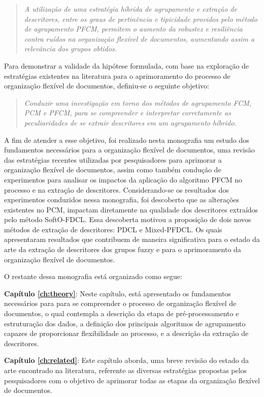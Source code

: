 \begin{quote}
\textit{A utilização de uma estratégia híbrida de agrupamento e extração de descritores, entre os 
  graus de pertinência e tipicidade providos pelo método de agrupamento PFCM, permitem o aumento da
    robustez e resiliência contra ruídos na organização flexível de documentos, aumentando assim a
    relevância dos grupos obtidos.}
\end{quote}

Para demonstrar a validade da hipótese formulada, com base na exploração de estratégias existentes
na literatura para o aprimoramento do processo de organização flexível de documentos, definiu-se o seguinte objetivo: 

\begin{quote}
\textit{Conduzir uma investigação em torno dos métodos de agrupamento FCM, PCM e PFCM, para
se compreender e interpretar corretamente as peculiaridades de se extrair descritores em um
agrupamento híbrido.}
\end{quote}

A fim de atender a esse objetivo, foi realizado nesta monografia um estudo dos fundamentos
necessários para a organização flexível de documentos, uma revisão das estratégias recentes
utilizadas por pesquisadores para aprimorar a organização flexível de documentos, assim como também
condução de experimentos para analisar os impactos da aplicação do algoritmo PFCM no processo e na
extração de descritores. Considerando-se os resultados dos experimentos conduzidos nessa monografia,
foi descoberto que as alterações existentes no PCM, impactam diretamente na qualidade dos
descritores extraídos pelo método SoftO-FDCL. Essa descoberta motivou a proposição de dois novos
métodos de extração de descritores: PDCL e Mixed-PFDCL. Os quais apresentaram resultados que
contribuem de maneira significativa para o estado da arte da extração de descritores dos grupos
fuzzy e para o aprimoramento da organização flexível de documentos.

O restante dessa monografia está organizado como segue:

{\bf Capítulo \ref{ch:theory}\/}: Neste capítulo, está apresentado os fundamentos necessários para para
se compreender o processo de organização flexível de documentos, o qual contempla a descrição da
etapa de pré-processamento e estruturação dos dados, a definição dos principais algoritmos de
agrupamento capazes de proporcionar flexibilidade ao processo, e a descrição da extração de
descritores.

{\bf Capítulo \ref{ch:related}\/}: Este capítulo aborda, uma breve revisão do estado da arte encontrado
na literatura, referente as diversas estratégias propostas pelos pesquisadores com o objetivo de
aprimorar todas as etapas da organização flexível de documentos. 

